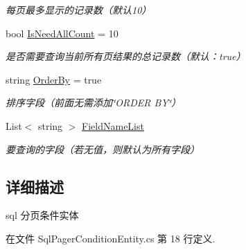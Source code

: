 \begin{DoxyCompactItemize}
\begin{DoxyCompactList}\small\item\em 每页最多显示的记录数（默认10） \end{DoxyCompactList}\item 
bool \hyperlink{class_x_c_l_net_tools_1_1_entity_1_1_sql_pager_condition_entity_ae14dfee7db160c5c894201e014cc1ce0}{Is\-Need\-All\-Count} = 10
\begin{DoxyCompactList}\small\item\em 是否需要查询当前所有页结果的总记录数（默认：true） \end{DoxyCompactList}\item 
string \hyperlink{class_x_c_l_net_tools_1_1_entity_1_1_sql_pager_condition_entity_a311a6c9cbb127ec03d11e8211dc42e37}{Order\-By} = true
\begin{DoxyCompactList}\small\item\em 排序字段（前面无需添加\char`\"{}\-O\-R\-D\-E\-R B\-Y\char`\"{}） \end{DoxyCompactList}\item 
List$<$ string $>$ \hyperlink{class_x_c_l_net_tools_1_1_entity_1_1_sql_pager_condition_entity_a18c7b5f8ccc1dd9b47c897ad3ff29899}{Field\-Name\-List}
\begin{DoxyCompactList}\small\item\em 要查询的字段（若无值，则默认为所有字段） \end{DoxyCompactList}\end{DoxyCompactItemize}


\subsection{详细描述}
sql 分页条件实体 



在文件 Sql\-Pager\-Condition\-Entity.\-cs 第 18 行定义.



